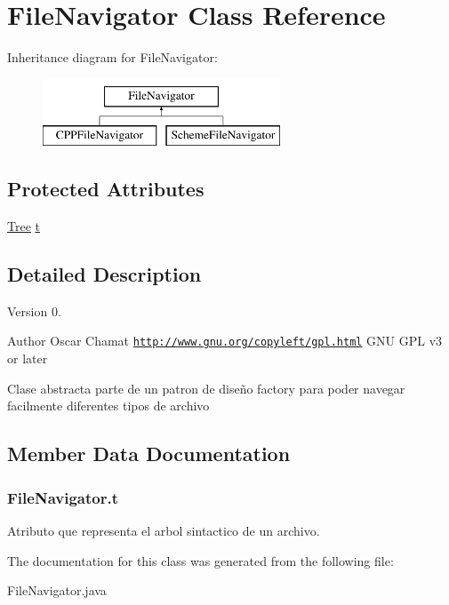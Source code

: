 \hypertarget{classFileNavigator}{\section{File\-Navigator Class Reference}
\label{classFileNavigator}
}
Inheritance diagram for File\-Navigator\-:\begin{figure}[H]
\begin{center}
\leavevmode
\includegraphics[height=2.000000cm]{classFileNavigator}
\end{center}
\end{figure}
\subsection*{Protected Attributes}
\begin{DoxyCompactItemize}
\item 
\hyperlink{classTree}{Tree} \hyperlink{classFileNavigator_a3db42b8bda212a686058434cceabe986}{t}
\end{DoxyCompactItemize}


\subsection{Detailed Description}
\begin{DoxyVersion}{Version}
0. 
\end{DoxyVersion}
\begin{DoxyAuthor}{Author}
Oscar Chamat  \href{http://www.gnu.org/copyleft/gpl.html}{\tt http\-://www.\-gnu.\-org/copyleft/gpl.\-html} G\-N\-U G\-P\-L v3 or later
\end{DoxyAuthor}
Clase abstracta parte de un patron de diseño factory para poder navegar facilmente diferentes tipos de archivo 

\subsection{Member Data Documentation}
\hypertarget{classFileNavigator_a3db42b8bda212a686058434cceabe986}{
\subsubsection[{t}]{ File\-Navigator.\-t\hspace{0.3cm}{\ttfamily [protected]}}}\label{classFileNavigator_a3db42b8bda212a686058434cceabe986}
Atributo que representa el arbol sintactico de un archivo. 

The documentation for this class was generated from the following file\-:\begin{DoxyCompactItemize}
\item 
File\-Navigator.\-java\end{DoxyCompactItemize}
